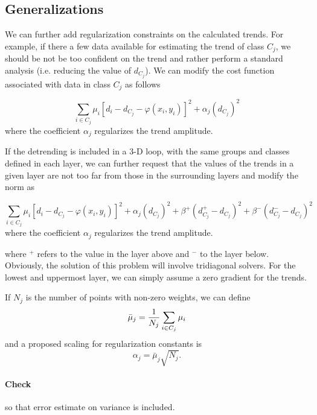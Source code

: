 \subsection{Generalizations}

We can further add regularization constraints on the calculated trends. For example, if there a few data available for estimating the trend of class $C_j$, we
should be not be too confident on the trend and rather perform a standard analysis (i.e. reducing the value of $d_{C_j}$). We can modify the
cost function associated with data in class $C_j$ as follows

\begin{equation}
\sum_{i\in C_j} \mu_i \left[ d_i -d_{C_j}- \varphi(x_i,y_i) \right]^2 + \alpha_j (d_{C_j})^2
\end{equation}
where the coefficient $\alpha_j$ regularizes the trend amplitude.

If the detrending is included in a 3-D loop, with the same groups and classes defined in each layer, we can further request that the values of the trends in a given layer are not too far from those in the surrounding layers and modify the norm as

\begin{equation}
\sum_{i\in C_j} \mu_i \left[ d_i -d_{C_j}- \varphi(x_i,y_i) \right]^2 + \alpha_j (d_{C_j})^2 + \beta^+ (d^+_{C_j}- d_{C_j})^2 + \beta^- (d^-_{C_j}- d_{C_j})^2
\end{equation}
where the coefficient $\alpha_j$ regularizes the trend amplitude.

where $^+$ refers to the value in the layer above and $^-$ to the layer below. Obviously, the solution of this problem will involve tridiagonal solvers. For the lowest and uppermost layer, we can simply assume a zero gradient for the trends.

If $N_j$ is the number of points with non-zero weights, we can define
\begin{equation}
\bar{\mu}_j = {1 \over N_j} \sum_{i\in C_j} \mu_i
\end{equation}
and a proposed scaling for regularization constants is
\begin{equation}
\alpha_j = \bar{\mu}_j \sqrt{N_j}.
\end{equation}

\paragraph{Check} so that error estimate on variance is included.

